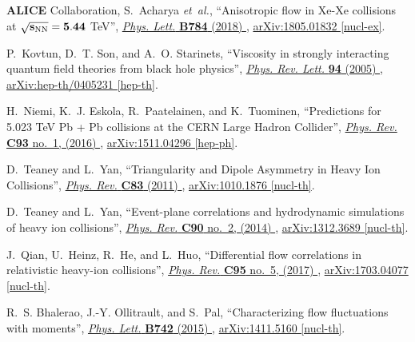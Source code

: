 \documentclass[ALICE,manyauthors]{cernphprep}
\begin{document}
\begin{thebibliography}{10}
{\bfseries ALICE} Collaboration, S.~Acharya {\em et~al.}, ``{Anisotropic flow
  in Xe-Xe collisions at $\mathbf{\sqrt{s_{\rm{NN}}} = 5.44}$ TeV}'',
  \href{http://dx.doi.org/10.1016/j.physletb.2018.06.059}{{\em Phys. Lett.}
  {\bfseries B784} (2018) },
\href{http://arxiv.org/abs/1805.01832}{{\ttfamily arXiv:1805.01832 [nucl-ex]}}.

P.~Kovtun, D.~T. Son, and A.~O. Starinets, ``{Viscosity in strongly interacting
  quantum field theories from black hole physics}'',
  \href{http://dx.doi.org/10.1103/PhysRevLett.94.111601}{{\em Phys. Rev. Lett.}
  {\bfseries 94} (2005) },
\href{http://arxiv.org/abs/hep-th/0405231}{{\ttfamily arXiv:hep-th/0405231
  [hep-th]}}.

H.~Niemi, K.~J. Eskola, R.~Paatelainen, and K.~Tuominen, ``{Predictions for
  5.023 TeV Pb + Pb collisions at the CERN Large Hadron Collider}'',
  \href{http://dx.doi.org/10.1103/PhysRevC.93.014912}{{\em Phys. Rev.}
  {\bfseries C93} no.~1, (2016) },
\href{http://arxiv.org/abs/1511.04296}{{\ttfamily arXiv:1511.04296 [hep-ph]}}.

D.~Teaney and L.~Yan, ``{Triangularity and Dipole Asymmetry in Heavy Ion
  Collisions}'', \href{http://dx.doi.org/10.1103/PhysRevC.83.064904}{{\em Phys.
  Rev.} {\bfseries C83} (2011) },
\href{http://arxiv.org/abs/1010.1876}{{\ttfamily arXiv:1010.1876 [nucl-th]}}.

D.~Teaney and L.~Yan, ``{Event-plane correlations and hydrodynamic simulations
  of heavy ion collisions}'',
  \href{http://dx.doi.org/10.1103/PhysRevC.90.024902}{{\em Phys. Rev.}
  {\bfseries C90} no.~2, (2014) },
\href{http://arxiv.org/abs/1312.3689}{{\ttfamily arXiv:1312.3689 [nucl-th]}}.

J.~Qian, U.~Heinz, R.~He, and L.~Huo, ``{Differential flow correlations in
  relativistic heavy-ion collisions}'',
  \href{http://dx.doi.org/10.1103/PhysRevC.95.054908}{{\em Phys. Rev.}
  {\bfseries C95} no.~5, (2017) },
\href{http://arxiv.org/abs/1703.04077}{{\ttfamily arXiv:1703.04077 [nucl-th]}}.

R.~S. Bhalerao, J.-Y. Ollitrault, and S.~Pal, ``{Characterizing flow
  fluctuations with moments}'',
  \href{http://dx.doi.org/10.1016/j.physletb.2015.01.019}{{\em Phys. Lett.}
  {\bfseries B742} (2015) },
\href{http://arxiv.org/abs/1411.5160}{{\ttfamily arXiv:1411.5160 [nucl-th]}}.


\end{thebibliography}
\end{document}
